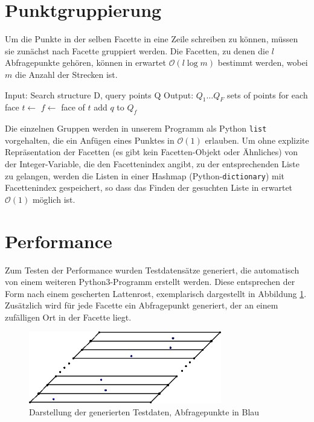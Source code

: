 \documentclass[11pt, a4paper]{article}
\begin{document}
\section{Punktgruppierung}
Um die Punkte in der selben Facette in eine Zeile schreiben zu können, müssen sie zunächst nach Facette gruppiert werden. Die Facetten, zu denen die $l$ Abfragepunkte gehören, können in erwartet $\mathcal{O}(l \log m)$ bestimmt werden, wobei $m$ die Anzahl der Strecken ist.

\begin{algorithmic}[1]
\State Input: Search structure D, query points Q
\State Output: $Q_1 \dots Q_F$ sets of points for each face
		\State $t \gets$ 
		\State $f \gets$ face of $t$
		\State add $q$ to $Q_f$
	\EndFor
\EndFunction
\end{algorithmic}

Die einzelnen Gruppen werden in unserem Programm als Python \texttt{list} vorgehalten, die ein Anfügen eines Punktes in $\mathcal{O}(1)$ erlauben. Um ohne explizite Repräsentation der Facetten (es gibt kein Facetten-Objekt oder Ähnliches) von der Integer-Variable, die den Facettenindex angibt, zu der entsprechenden Liste zu gelangen, werden die Listen in einer Hashmap (Python-\texttt{dictionary}) mit Facettenindex gespeichert, so dass das Finden der gesuchten Liste in erwartet $\mathcal{O}(1)$ möglich ist.

\section{Performance}
\label{sec:performance}

Zum Testen der Performance wurden Testdatensätze generiert, die automatisch von einem weiteren Python3-Programm erstellt werden. Diese entsprechen der Form nach einem gescherten Lattenrost, exemplarisch dargestellt in Abbildung \ref{fig:generated_dataset}. Zusätzlich wird für jede Facette ein Abfragepunkt generiert, der an einem zufälligen Ort in der Facette liegt.

\begin{figure}[h!]
	\centering
	\includegraphics[width=0.75\textwidth]{generated_dataset}
	\caption{Darstellung der generierten Testdaten, Abfragepunkte in Blau}
	\label{fig:generated_dataset}
\end{figure}
\end{document}

